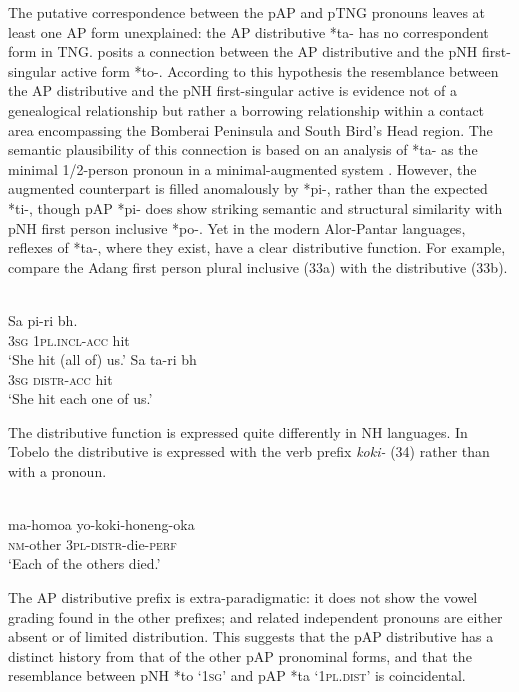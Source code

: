 The putative correspondence between the pAP and pTNG pronouns leaves at least one AP form unexplained: the AP distributive *ta- has no correspondent form in TNG. \citet{Donohue2008boundpron} posits a connection between the AP distributive and the pNH first-singular active form *to-. According to this hypothesis the resemblance between the AP distributive and the pNH first-singular active is evidence not of a genealogical relationship but rather a borrowing relationship within a contact area encompassing the Bomberai Peninsula and South Bird's Head region. The semantic plausibility of this connection is based on an analysis of *ta- as the minimal 1/2-person pronoun in a minimal-augmented system \citep{Donohue2007phonological}. However, the augmented counterpart is filled anomalously by *pi-, rather than the expected *ti-, though pAP *pi- does show striking semantic and structural similarity with pNH first person inclusive *po-. Yet in the modern Alor-Pantar languages, reflexes of *ta-, where they exist, have a clear distributive
function. For example, compare the Adang first person plural inclusive (33a) with the distributive (33b).


\ea%
 \\
\ea
\gll Sa pi-ri b{\textepsilon}h. \\
    \textsc{3sg} \textsc{1pl.incl-acc} hit \\
\glt `She hit (all of) us.' 
  \ex 
  \gll Sa ta-ri b{\textepsilon}h \\
  \textsc{3sg} \textsc{distr-acc} hit \\
\glt `She hit each one of us.'
  \z
\z

The distributive function is expressed quite differently in NH languages. In Tobelo the distributive is expressed with the verb prefix \textit{koki-} (34) rather than with a pronoun.


\ea%
 \\
\gll  ma-homoa yo-koki-honeng-oka  \\
   \textsc{nm}-other \textsc{3pl-distr}-die-\textsc{perf} \\
\glt `Each of the others died.'
\z





The AP distributive prefix is extra-paradigmatic: it does not show the vowel grading found in the other prefixes; and  related independent pronouns are either absent or of limited distribution. This suggests that the pAP distributive has a distinct history from that of the other pAP pronominal forms, and that the resemblance between pNH *to `\textsc{1sg}' and pAP *ta `\textsc{1pl.dist}' is coincidental.

